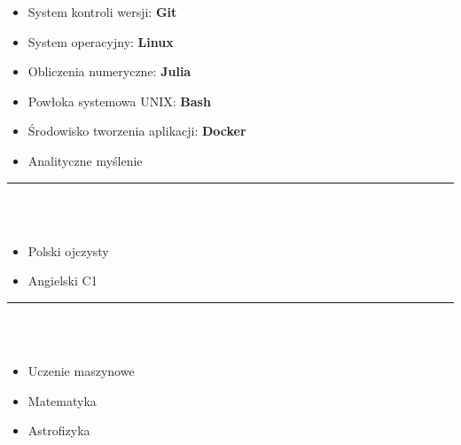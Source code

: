 \documentclass[10pt]{article}
\begin{document}
\begin{minipage}[t]{0.30\textwidth}
\begin{itemize}[leftmargin=*]
            \item System kontroli wersji: \textbf{Git}
            \item System operacyjny: \textbf{Linux}
            \item Obliczenia numeryczne: \textbf{Julia}
            \item Powłoka systemowa UNIX: \textbf{Bash} 
            \item Środowisko tworzenia aplikacji: \textbf{Docker}
            \item Analityczne myślenie
        \end{itemize}
        \rule{6cm}{1pt} \\ \\
        \fontsize{10pt}{10pt}
        \begin{itemize}[leftmargin=*]
            \setlength{\parskip}{0pt}
            \item Polski ojczysty
            \item Angielski C1
        \end{itemize}
        \rule{6cm}{1pt} \\ \\
        \fontsize{10pt}{10pt}
        \begin{itemize}[leftmargin=*]
            \setlength{\parskip}{0pt}
            \item Uczenie maszynowe
            \item Matematyka
            \item Astrofizyka
        \end{itemize}
    \end{minipage}
    \hfill %
\end{document}

